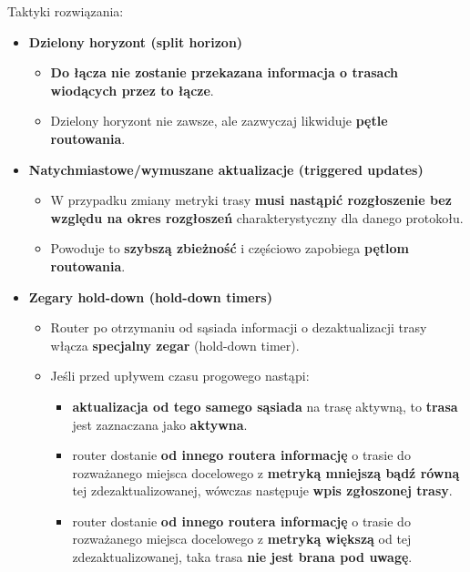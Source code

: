 \documentclass[../main.tex]{subfiles}
\begin{document}
    Taktyki rozwiązania:
    \begin{itemize}
        \item \textbf{Dzielony horyzont (split horizon)}
        \begin{itemize}
            \item \textbf{Do łącza nie zostanie przekazana informacja o trasach wiodących przez to łącze}.
            \item Dzielony horyzont nie zawsze, ale zazwyczaj likwiduje \textbf{pętle routowania}.
        \end{itemize}

        \item \textbf{Natychmiastowe/wymuszane aktualizacje (triggered updates)}
        \begin{itemize}
            \item W przypadku zmiany metryki trasy \textbf{musi nastąpić rozgłoszenie bez względu na okres
            rozgłoszeń} charakterystyczny dla danego protokołu.
            \item Powoduje to \textbf{szybszą zbieżność} i częściowo zapobiega \textbf{pętlom routowania}.
        \end{itemize}

        \item \textbf{Zegary hold-down (hold-down timers)}
        \begin{itemize}
            \item Router po otrzymaniu od sąsiada informacji o dezaktualizacji trasy włącza \textbf{specjalny zegar} (hold-down timer).
            \item Jeśli przed upływem czasu progowego nastąpi:
            \begin{itemize}
                \item \textbf{aktualizacja od tego samego sąsiada} na trasę aktywną, to \textbf{trasa} jest zaznaczana jako \textbf{aktywna}.
                \item router dostanie \textbf{od innego routera informację} o trasie do rozważanego miejsca docelowego z \textbf{metryką mniejszą bądź równą} tej zdezaktualizowanej, wówczas następuje \textbf{wpis zgłoszonej trasy}.
                \item router dostanie \textbf{od innego routera informację} o trasie do rozważanego miejsca docelowego z \textbf{metryką większą} od tej zdezaktualizowanej, taka trasa \textbf{nie jest brana pod uwagę}.
            \end{itemize}
        \end{itemize}
    \end{itemize}
\end{document}
